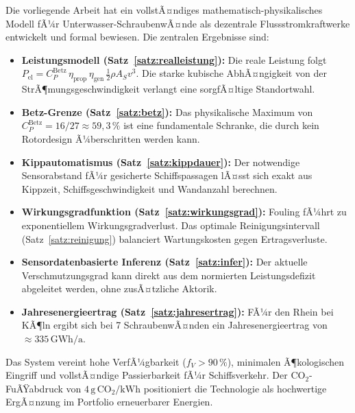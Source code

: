 ﻿\documentclass[a4paper,12pt]{article}
\theoremstyle{definition}
\begin{document}
Die vorliegende Arbeit hat ein vollstÃ¤ndiges mathematisch-physikalisches Modell fÃ¼r
Unterwasser-SchraubenwÃ¤nde als dezentrale Flussstromkraftwerke entwickelt und
formal bewiesen. Die zentralen Ergebnisse sind:

\begin{itemize}
  \item \textbf{Leistungsmodell (Satz~\ref{satz:realleistung}):} Die reale Leistung folgt $P_{\mathrm{el}} = C_P^{\mathrm{Betz}}\,\eta_{\mathrm{prop}}\,\eta_{\mathrm{gen}}\,
        \frac{1}{2}\rho A_S v^3$. Die starke kubische AbhÃ¤ngigkeit von der StrÃ¶mungsgeschwindigkeit
        verlangt eine sorgfÃ¤ltige Standortwahl.

  \item \textbf{Betz-Grenze (Satz~\ref{satz:betz}):} Das physikalische Maximum von
        $C_P^{\mathrm{Betz}} = 16/27 \approx 59{,}3\,\%$ ist eine fundamentale Schranke,
        die durch kein Rotordesign Ã¼berschritten werden kann.

  \item \textbf{Kippautomatismus (Satz~\ref{satz:kippdauer}):} Der notwendige
        Sensorabstand fÃ¼r gesicherte Schiffspassagen lÃ¤sst sich exakt aus Kippzeit,
        Schiffsgeschwindigkeit und Wandanzahl berechnen.

  \item \textbf{Wirkungsgradfunktion (Satz~\ref{satz:wirkungsgrad}):} Fouling fÃ¼hrt
        zu exponentiellem Wirkungsgradverlust. Das optimale Reinigungsintervall
        (Satz~\ref{satz:reinigung}) balanciert Wartungskosten gegen Ertragsverluste.

  \item \textbf{Sensordatenbasierte Inferenz (Satz~\ref{satz:infer}):} Der aktuelle
        Verschmutzungsgrad kann direkt aus dem normierten Leistungsdefizit abgeleitet werden,
        ohne zusÃ¤tzliche Aktorik.

  \item \textbf{Jahresenergieertrag (Satz~\ref{satz:jahresertrag}):} FÃ¼r den Rhein bei
        KÃ¶ln ergibt sich bei 7 SchraubenwÃ¤nden ein Jahresenergieertrag von $\approx 335\,\mathrm{GWh/a}$.
\end{itemize}

Das System vereint hohe VerfÃ¼gbarkeit ($f_V > 90\,\%$), minimalen Ã¶kologischen Eingriff
und vollstÃ¤ndige Passierbarkeit fÃ¼r Schiffsverkehr. Der CO$_2$-FuÃŸabdruck von
$4\,\mathrm{g\,CO_2/kWh}$ positioniert die Technologie als hochwertige ErgÃ¤nzung im
Portfolio erneuerbarer Energien.
\end{document}
